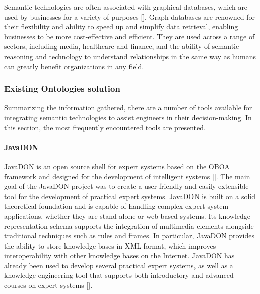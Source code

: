             Semantic technologies are often associated with graphical databases, which are used by businesses for a variety of purposes []. Graph databases are renowned for their flexibility and ability to speed up and simplify data retrieval, enabling businesses to be more cost-effective and efficient. They are used across a range of sectors, including media, healthcare and finance, and the ability of semantic reasoning and technology to understand relationships in the same way as humans can greatly benefit organizations in any field.\\
        
        \subsubsection{Existing Ontologies solution\label{sec:exonto}}
        Summarizing the information gathered, there are a number of tools available for integrating semantic technologies to assist engineers in their decision-making. In this section, the most frequently encountered tools are presented.
        
            \paragraph{JavaDON}
            JavaDON is an open source shell for expert systems based on the OBOA framework and designed for the development of intelligent systems []. The main goal of the JavaDON project was to create a user-friendly and easily extensible tool for the development of practical expert systems. JavaDON is built on a solid theoretical foundation and is capable of handling complex expert system applications, whether they are stand-alone or web-based systems. Its knowledge representation schema supports the integration of multimedia elements alongside traditional techniques such as rules and frames. In particular, JavaDON provides the ability to store knowledge bases in XML format, which improves interoperability with other knowledge bases on the Internet. JavaDON has already been used to develop several practical expert systems, as well as a knowledge engineering tool that supports both introductory and advanced courses on expert systems [].
        
